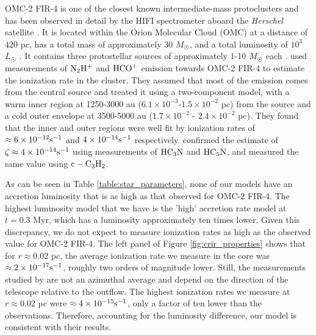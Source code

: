 \documentclass[twocolumn]{aastex63}
\begin{document}
OMC-2 FIR-4 is one of the closest known intermediate-mass protoclusters and has been observed in detail by the HIFI spectrometer aboard the \textit{Herschel} satellite \citep{ceccarelli_2014_omc}. It is located within the Orion Molecular Cloud (OMC) at a distance of 420 pc, has a total mass of approximately 30 $M_{\astrosun}$, and a total luminosity of $10^{3}$ $L_{\astrosun}$ \citep{kim_2008_omc, crimier_2009_omc, lopez_2013_omc2}. It contains three protostellar sources of approximately 1-10 $M_{\astrosun}$ each \citep{lopez_2013_omc2}. \cite{ceccarelli_2014_omc} used measurements of $\rm N_2H^+$ and $\rm HCO^+$ emission towards OMC-2 FIR-4 to estimate the ionization rate in the cluster. They assumed that most of the emission comes from the central source and treated it using a two-component model, with a warm inner region at 1250-3000 au ($6.1 \times 10^{-3}$-$1.5 \times 10^{-2}$  pc) from the source and a cold outer envelope at 3500-5000 au ($1.7 \times 10^{-2}$ - $2.4 \times 10^{-2}$ pc). They found that the inner and outer regions were well fit by ionization rates of $\approx 6\times 10^{-12} \rm s^{-1}$ and $4 \times 10^{-14} \rm s^{-1}$ respectively. \cite{fontani_2017_omc2} confirmed the estimate of $\zeta \approx 4 \times 10^{-14} \rm s^{-1}$ using measurements of $\rm HC_3N$ and $\rm HC_5N$, and \cite{favre_2018_omc} measured the same value using $\rm c-C_3H_2$. 

As can be seen in Table \ref{table:star_parameters}, none of our models have an accretion luminosity that is as high as that observed for OMC-2 FIR-4. The highest luminosity model that we have is the 'high' accretion rate model at $t=0.3$ Myr, which has a luminosity approximately ten times lower. Given this discrepancy, we do not expect to measure ionization rates as high as the observed value for OMC-2 FIR-4. The left panel of Figure \ref{fig:crir_properties} shows that for $r \approx 0.02$ pc, the average ionization rate we measure in the core was $\approx 2 \times 10^{-17} \rm s^{-1}$, roughly two orders of magnitude lower. Still, the measurements studied by \cite{ceccarelli_2014_omc} are not an azimuthal average and depend on the direction of the telescope relative to the outflow. The highest ionization rates we measure at $r \approx 0.02$ pc were $\approx 4 \times 10^{-15} \rm s^{-1}$, only a factor of ten lower than the \cite{ceccarelli_2014_omc} observations. Therefore, accounting for the luminosity difference, our model is consistent with their results. 
\end{document}
